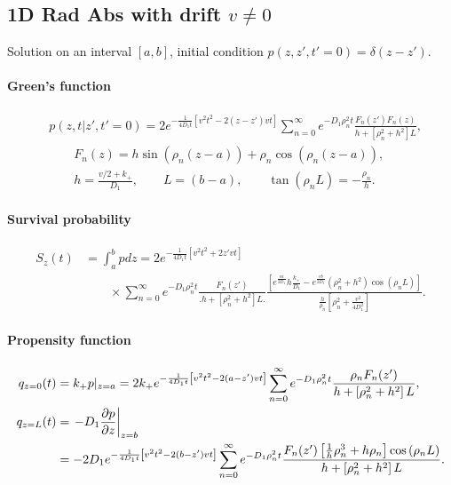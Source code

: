 
\subsection{1D Rad Abs with drift $v\neq 0$}

Solution on an interval $[a,b]$, initial condition $p(z,z',t'=0)=\delta (z-z')$.

\newcommand{\rn}{\rho_n}

\paragraph{Green's function}
\begin{align}
  & p(z,t|z',t'=0) = 2e^{-\frac{1}{4D_1t}\left[v^2t^2 - 2(z-z')vt \right]}
      \sum_{n=0}^{\infty} e^{-D_1\rn^2t} \frac{ F_n(z')F_n(z) }
      {h + \left[\rn^2 + h^2\right]L}, \\
  &\quad\quad F_n(z) = h\sin\left(\rn(z-a)\right) +  \rn\cos\left(\rn(z-a)\right)  , \\
  &\quad\quad h = \frac{v/2 + k_+}{D_1}, \quad\quad L=(b-a), \quad\quad \tan\left(\rn L\right)=-\frac{\rn}{h}.
\end{align}

\paragraph{Survival probability}
\begin{align}
  S_z(t)
  &= \int_a^b pdz = 2e^{-\frac{1}{4D_1t}\left[ v^2t^2 + 2z'vt \right]} \\
  &\quad\quad
    \times\sum_{n=0}^{\infty} e^{-D_1\rn^2t}
    \frac{F_n(z')}{\Big. h + \left[\rn^2 + h^2\right]L \Big.}
    \frac{
    \left[
	  e^{\frac{va}{2D_1}} h \frac{k_+}{D_1}
	- e^{\frac{vb}{2D_1}} \left(\rn^2 + h^2\right) \cos(\rn L)
    \right]
    }
    {\frac{h}{\rn}\left[ \rn^2 + \frac{v^2}{4 D_1^2} \right]}.
\end{align}

\paragraph{Propensity function}
\begin{align}
  q_{z=0}(t) &= k_+ p|_{z=a} = 2k_+ e^{-\frac{1}{4D_1t}\left[v^2t^2 - 2(a-z')vt \right]} 
  \sum_{n=0}^{\infty} e^{-D_1\rn^2t}
  \frac{ \rn F_n(z')} {h + \left[\rn^2 + h^2\right]L}, \\
  q_{z=L}(t) &= \left.- D_1 \pd{p}{z}\right|_{z=b} \\
  &=  -2D_1 e^{-\frac{1}{4D_1t}\left[v^2t^2 - 2(b-z')vt \right]} 
    \sum_{n=0}^{\infty} e^{-D_1\rn^2t}
    \frac{F_n(z') \left[\frac{1}{h}\rn^3 + h\rn\right]\cos\left(\rn L\right)
 }
  {h + \left[\rn^2 + h^2\right]L}.
\end{align}

